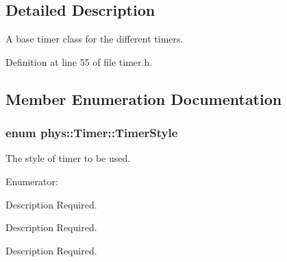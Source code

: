 \subsection{Detailed Description}
A base timer class for the different timers. 

Definition at line 55 of file timer.h.



\subsection{Member Enumeration Documentation}
\hypertarget{classphys_1_1Timer_a1ee86bf43e20329d750c5d582dcce329}{
\subsubsection[{TimerStyle}]{\setlength{\rightskip}{0pt plus 5cm}enum {\bf phys::Timer::TimerStyle}}}
\label{d3/d83/classphys_1_1Timer_a1ee86bf43e20329d750c5d582dcce329}


The style of timer to be used. 

\begin{Desc}
\item[Enumerator: ]\par
\begin{description}
\item[{\em 
\hypertarget{classphys_1_1Timer_a1ee86bf43e20329d750c5d582dcce329a5debd5b8437d14405bf25cd9b130449f}{
Normal}
\label{d3/d83/classphys_1_1Timer_a1ee86bf43e20329d750c5d582dcce329a5debd5b8437d14405bf25cd9b130449f}
}]Description Required. \item[{\em 
\hypertarget{classphys_1_1Timer_a1ee86bf43e20329d750c5d582dcce329a7599daa63100c2134df7d8b7c9b7f867}{
StopWatch}
\label{d3/d83/classphys_1_1Timer_a1ee86bf43e20329d750c5d582dcce329a7599daa63100c2134df7d8b7c9b7f867}
}]Description Required. \item[{\em 
\hypertarget{classphys_1_1Timer_a1ee86bf43e20329d750c5d582dcce329ae9b9fa35767e4ac2c87c078e1d9a0729}{
Alarm}
\label{d3/d83/classphys_1_1Timer_a1ee86bf43e20329d750c5d582dcce329ae9b9fa35767e4ac2c87c078e1d9a0729}
}]Description Required. \end{description}
\end{Desc}



